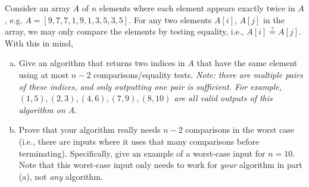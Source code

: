 \documentclass[11pt]{article}
\begin{document}
    \newpage
    \begin{tcolorbox}[title={Problem 2 (Finding Duplicates, 30 pts)}] \setlength\parindent{1em}
        Consider an array $A$ of $n$ elements where each element appears exactly twice in $A$, e.g. $A=[9, 7, 7, 1, 9, 1, 3, 5, 3, 5]$. For any two elements $A[i]$, $A[j]$ in the array, we may only compare the elements by testing equality, i.e., $A[i] \overset{?}{=} A[j]$. With this in mind,
        \begin{enumerate}[(a)]
            \item Give an algorithm that returns two indices in $A$ that have the same element using at most $n-2$ comparisons/equality tests. \emph{Note: there are multiple pairs of these indices, and only outputting one pair is sufficient. For example, $(1, 5), (2, 3), (4, 6), (7, 9), (8, 10)$ are all valid outputs of this algorithm on $A$.}
            \item Prove that your algorithm really needs $n-2$ comparisons in the worst case (i.e., there are inputs where it uses that many comparisons before terminating). Specifically, give an example of a worst-case input for $n = 10$. Note that this worst-case input only needs to work for \emph{your} algorithm in part (a), not \emph{any} algorithm.
        \end{enumerate}
    \end{tcolorbox}
\end{document}
